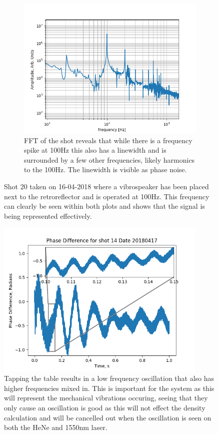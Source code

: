 \documentclass[12pt,a4paper,oneside]{report}
\begin{document}
\begin{figure}[H]
\begin{subfigure}{.5\textwidth}
    \includegraphics[width=\textwidth, angle=0]{DImages/FFT_for_shot_20_Date_20180416.png}
    \caption{FFT of the shot reveals that while there is a frequency spike at 100Hz this also has a linewidth and is surrounded by a few other frequencies, likely harmonics to the 100Hz. The linewidth is visible as phase noise.}
  \end{subfigure}
\caption{Shot 20 taken on 16-04-2018 where a vibrospeaker has been placed next to the retroreflector and is operated at 100Hz. This frequency can clearly be seen within both plots and shows that the signal is being represented effectively.}
\label{fig:2-modulating-vib}
\end{figure}

\begin{figure}[H] 
\includegraphics[width=0.9\textwidth, center,angle=0]{DImages/Shot_14_20180417_Zoom_Plot.png}
\caption{Tapping the table results in a low frequency oscillation that also has higher frequencies mixed in. This is important for the system as this will represent the mechanical vibrations occuring, seeing that they only cause an oscillation is good as this will not effect the density calculation and will be cancelled out when the oscillation is seen on both the HeNe and 1550nm laser.}
\label{fig:PD-shot-14-20180416-zoomedplot}
\end{figure}
\end{document}
